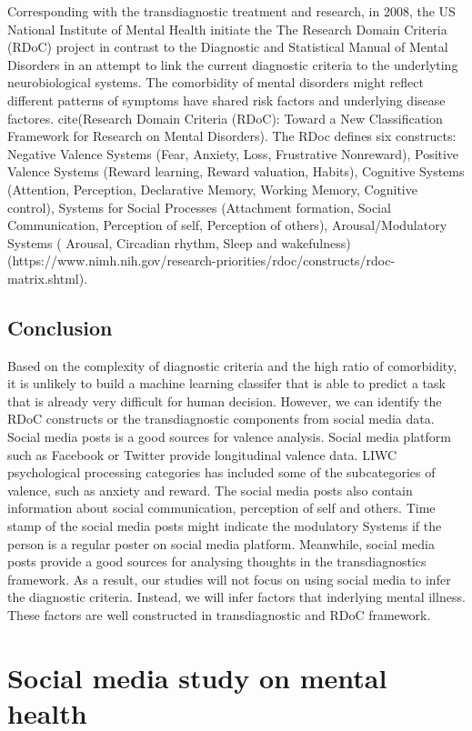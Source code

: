 Corresponding with the transdiagnostic treatment and research, in 2008, the US National Institute of Mental Health initiate the The Research Domain Criteria (RDoC) project in contrast to the  Diagnostic and Statistical Manual of Mental Disorders in an attempt to link the current diagnostic criteria to the underlyting neurobiological systems. The comorbidity of mental disorders might reflect different patterns of symptoms have shared risk factors and underlying disease factores. cite(Research Domain Criteria (RDoC): Toward a New Classification Framework for Research on Mental Disorders). The RDoc defines six constructs: Negative Valence Systems (Fear, Anxiety, Loss, Frustrative Nonreward), Positive Valence Systems (Reward learning, Reward valuation, Habits), Cognitive Systems (Attention, Perception, Declarative Memory, Working Memory, Cognitive control), Systems for Social Processes (Attachment formation, Social Communication, Perception of self, Perception of others), Arousal/Modulatory Systems (
Arousal, Circadian rhythm, Sleep and wakefulness) (https://www.nimh.nih.gov/research-priorities/rdoc/constructs/rdoc-matrix.shtml). 


\subsection{Conclusion}
Based on the complexity of diagnostic criteria and the high ratio of comorbidity, it is unlikely to build a machine learning classifer that is able to predict a task that is already very difficult for human decision. However, we can identify the RDoC constructs or the transdiagnostic components from social media data. Social media posts is a good sources for valence analysis. Social media platform such as Facebook or Twitter provide longitudinal valence data. LIWC psychological processing categories has included some of the subcategories of valence, such as anxiety and reward. The social media posts also contain information about social communication, perception of self and others. Time stamp of the social media posts might indicate the modulatory Systems if the person is a regular poster on social media platform. Meanwhile, social media posts provide a good sources for analysing thoughts in the transdiagnostics framework. As a result, our studies will not focus on using social media to infer the diagnostic criteria. Instead, we will infer factors that inderlying mental illness. These factors are well constructed in transdiagnostic and RDoC framework.


\section{Social media study on mental health}


